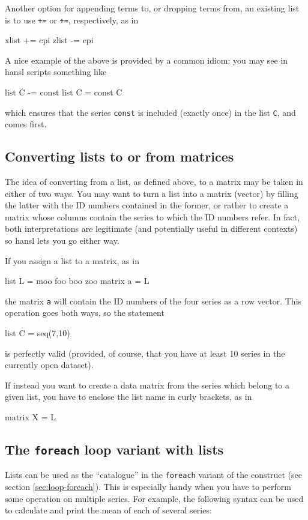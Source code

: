 Another option for appending terms to, or dropping terms from, an
existing list is to use \texttt{+=} or \texttt{+=}, respectively, as
in
\begin{code}
xlist += cpi
zlist -= cpi
\end{code}
A nice example of the above is provided by a common idiom: you may
see in hansl scripts something like
\begin{code}
  list C -= const
  list C = const C
\end{code}
which ensures that the series \texttt{const} is included (exactly
once) in the list \texttt{C}, and comes first.

\subsection{Converting lists to or from matrices}

The idea of converting from a list, as defined above, to a matrix may
be taken in either of two ways. You may want to turn a list into a
matrix (vector) by filling the latter with the ID numbers contained in
the former, or rather to create a matrix whose columns contain the
series to which the ID numbers refer. In fact, both interpretations
are legitimate (and potentially useful in different contexts) so hansl
lets you go either way.

If you assign a list to a matrix, as in
\begin{code}
  list L = moo foo boo zoo
  matrix a = L
\end{code}
the matrix \texttt{a} will contain the ID numbers of the four series
as a row vector. This operation goes both ways, so the statement
\begin{code}
  list C = seq(7,10)
\end{code}
is perfectly valid (provided, of course, that you have at least 10
series in the currently open dataset).

If instead you want to create a data matrix from the series which
belong to a given list, you have to enclose the list name in curly
brackets, as in
\begin{code}
  matrix X = {L}
\end{code}

\subsection{The \texttt{foreach} loop variant with lists}

Lists can be used as the ``catalogue'' in the \texttt{foreach} variant
of the  construct (see section \ref{sec:loop-foreach}). This
is especially handy when you have to perform some operation on
multiple series. For example, the following syntax can be used to
calculate and print the mean of each of several series:

